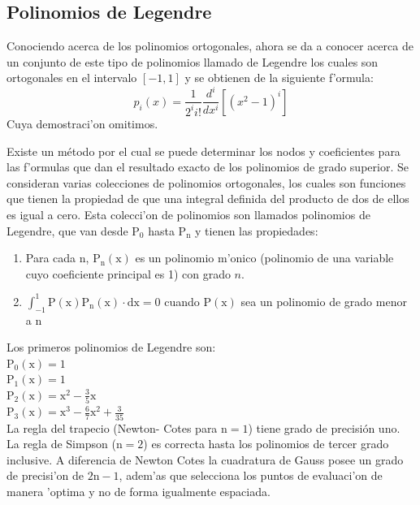 \documentclass{article}
\begin{document}
				\subsection*{Polinomios de Legendre}
					Conociendo acerca de los polinomios ortogonales, ahora se da a conocer acerca de un conjunto de este tipo de polinomios llamado de Legendre los cuales son ortogonales en el intervalo $\mathrm{[-1, 1]}$ y se obtienen de la siguiente f'ormula:		
					\begin{equation}
						p_{i}(x)=\frac{1}{2^{i}i!}\frac{d^{i}}{d x^{i}}[(x^{2}-1)^{i}]
					\end{equation}
					Cuya demostraci'on omitimos.
					
					Existe un método por el cual se puede determinar los nodos y coeficientes  para las f'ormulas que dan el resultado exacto de los polinomios de grado superior. Se consideran varias colecciones de polinomios ortogonales, los cuales son funciones que tienen la propiedad de que una integral definida del producto de dos de ellos es igual a cero. Esta colecci'on de polinomios son llamados polinomios de Legendre, que van desde $\mathrm{P_{0}}$ hasta $\mathrm{P_{n}}$ y tienen las propiedades:
					\begin{enumerate}[1.]
						\item 
						Para cada $\mathrm{n}$, $\mathrm{P_{n}(x)}$ es un polinomio m'onico (polinomio de una variable cuyo coeficiente principal es 1) con grado $n$.
						\item
						$\mathrm{\int_{-1}^{1}P(x)P_{n}(x)\cdot dx = 0}$ cuando $\mathrm{P(x)}$ sea un polinomio de grado menor a $\mathrm{n}$
					\end{enumerate}
					
					Los primeros polinomios de Legendre son:\\
					$\mathrm{P_{0}(x)=1}$\\
					$\mathrm{P_{1}(x)=1}$\\
					$\mathrm{P_{2}(x)=x^{2}-\frac{3}{5}x}$\\
					$\mathrm{P_{3}(x)=x^{3}-\frac{6}{7}x^{2}+\frac{3}{35}}$\\
					
				
				La regla del trapecio (Newton- Cotes para $\mathrm{n = 1}$) tiene grado de precisión uno. La regla de Simpson ($\mathrm{n = 2}$) es correcta hasta los polinomios de tercer grado inclusive. A diferencia de Newton Cotes la cuadratura de Gauss posee un grado de precisi'on de $\mathrm{2n-1}$, adem'as que selecciona los puntos de evaluaci'on de manera 'optima y no de forma igualmente espaciada.
				
\end{document}
